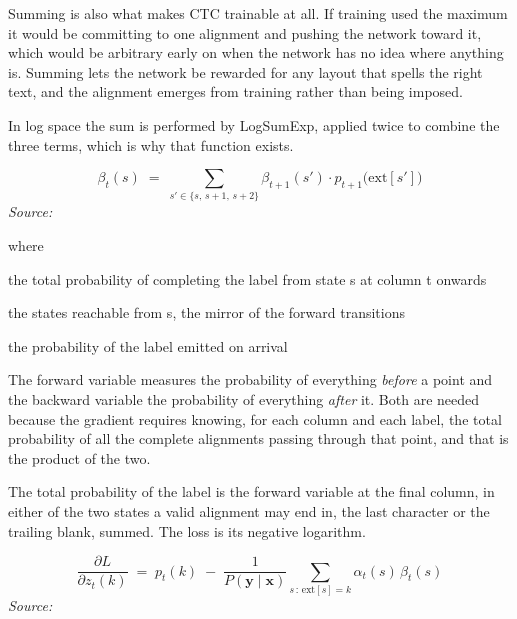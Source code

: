 Summing is also what makes CTC trainable at all. If training used the maximum it would be committing to one alignment and pushing the network toward it, which would be arbitrary early on when the network has no idea where anything is. Summing lets the network be rewarded for any layout that spells the right text, and the alignment emerges from training rather than being imposed.

In log space the sum is performed by LogSumExp, applied twice to combine the three terms, which is why that function exists.



\begin{equation}
\beta_t(s) \;=\; \sum_{s' \in \{s,\,s+1,\,s+2\}} \beta_{t+1}(s') \cdot p_{t+1}\big(\mathrm{ext}[s']\big)
\end{equation}
\noindent\emph{Source: }\cite{graves2006}


\noindent where
\begin{description}[leftmargin=2.4em,style=nextline,font=\normalfont\ttfamily]\setlength\itemsep{1pt}
  \item[{$\beta_t(s)$}] \normalfont the total probability of completing the label from state s at column t onwards
  \item[{$s'$}] \normalfont the states reachable from s, the mirror of the forward transitions
  \item[{$p_{t+1}(\cdot)$}] \normalfont the probability of the label emitted on arrival
\end{description}
The forward variable measures the probability of everything \emph{before} a point and the backward variable the probability of everything \emph{after} it. Both are needed because the gradient requires knowing, for each column and each label, the total probability of all the complete alignments passing through that point, and that is the product of the two.


The total probability of the label is the forward variable at the final column, in either of the two states a valid alignment may end in, the last character or the trailing blank, summed. The loss is its negative logarithm.



\begin{equation}
\frac{\partial L}{\partial z_t(k)} \;=\; p_t(k) \;-\; \frac{1}{P(\mathbf{y}\mid\mathbf{x})} \!\!\sum_{s \,:\, \mathrm{ext}[s] = k} \!\! \alpha_t(s)\,\beta_t(s)
\end{equation}
\noindent\emph{Source: }\cite{graves2006}


